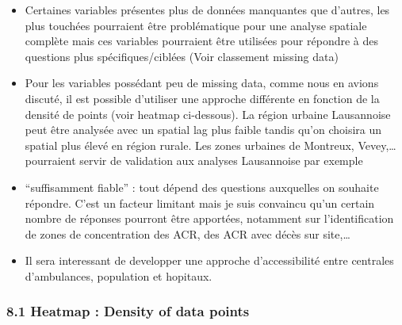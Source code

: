 \documentclass[11pt]{article}
\providecommand{\tightlist}{%
      \setlength{\itemsep}{0pt}\setlength{\parskip}{0pt}}
\begin{document}
\begin{itemize}
\tightlist
\item
  Certaines variables présentes plus de données manquantes que d'autres,
  les plus touchées pourraient être problématique pour une analyse
  spatiale complète mais ces variables pourraient être utilisées pour
  répondre à des questions plus spécifiques/ciblées (Voir classement
  missing data)
\item
  Pour les variables possédant peu de missing data, comme nous en avions
  discuté, il est possible d'utiliser une approche différente en
  fonction de la densité de points (voir heatmap ci-dessous). La région
  urbaine Lausannoise peut être analysée avec un spatial lag plus faible
  tandis qu'on choisira un spatial plus élevé en région rurale. Les
  zones urbaines de Montreux, Vevey,\ldots{} pourraient servir de
  validation aux analyses Lausannoise par exemple
\item
  ``suffisamment fiable'' : tout dépend des questions auxquelles on
  souhaite répondre. C'est un facteur limitant mais je suis convaincu
  qu'un certain nombre de réponses pourront être apportées, notamment
  sur l'identification de zones de concentration des ACR, des ACR avec
  décès sur site,\ldots{}
\item
  Il sera interessant de developper une approche d'accessibilité entre
  centrales d'ambulances, population et hopitaux.
\end{itemize}

    \hypertarget{heatmap-density-of-data-points}{%
\subsubsection{8.1 Heatmap : Density of data
points}\label{heatmap-density-of-data-points}}
\end{document}
